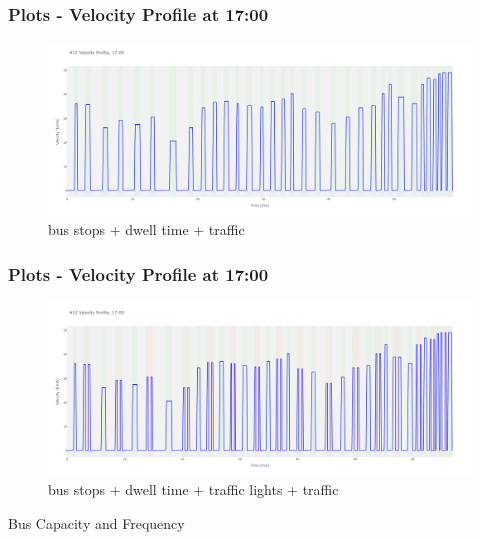 \documentclass[12pt]{beamer}
\begin{document}
\begin{frame}
\frametitle{Plots - Velocity Profile at 17:00}
\begin{figure}
    \centering
    \includegraphics[width=\textwidth]{plots/vel_profile_1700_traffic.png}
    \caption{bus stops + dwell time + traffic}
\end{figure}
\end{frame}

\begin{frame}
\frametitle{Plots - Velocity Profile at 17:00}
\begin{figure}
    \centering
    \includegraphics[width=\textwidth]{plots/vel_profile_1700_all.png}
    \caption{bus stops + dwell time + traffic lights + traffic}
\end{figure}
\end{frame}

\begin{frame}
\begin{center}
\Huge{Bus Capacity and Frequency}
\end{center}
\end{frame}
\end{document}
